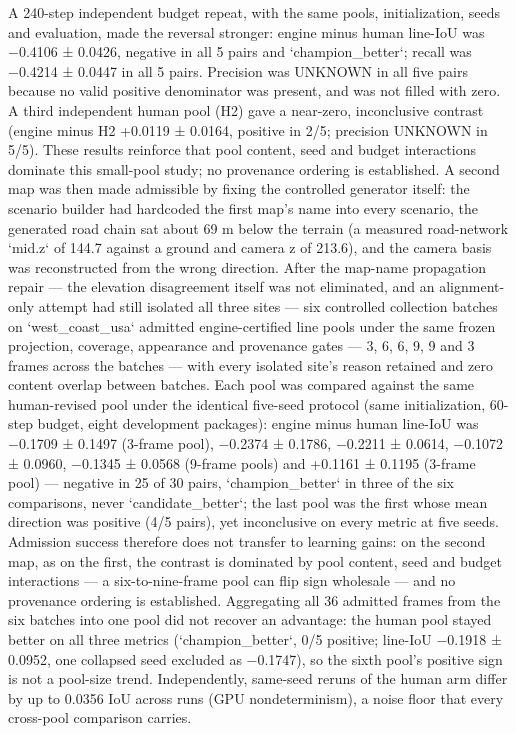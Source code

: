 \documentclass[journal]{IEEEtran}
\begin{document}
A 240-step independent budget repeat, with the same pools, initialization, seeds and evaluation, made the reversal stronger: engine minus human line-IoU was −0.4106 ± 0.0426, negative in all 5 pairs and `champion_better`; recall was −0.4214 ± 0.0447 in all 5 pairs. Precision was UNKNOWN in all five pairs because no valid positive denominator was present, and was not filled with zero. A third independent human pool (H2) gave a near-zero, inconclusive contrast (engine minus H2 +0.0119 ± 0.0164, positive in 2/5; precision UNKNOWN in 5/5). These results reinforce that pool content, seed and budget interactions dominate this small-pool study; no provenance ordering is established.
A second map was then made admissible by fixing the controlled generator itself: the scenario builder had hardcoded the first map's name into every scenario, the generated road chain sat about 69 m below the terrain (a measured road-network `mid.z` of 144.7 against a ground and camera z of 213.6), and the camera basis was reconstructed from the wrong direction. After the map-name propagation repair --- the elevation disagreement itself was not eliminated, and an alignment-only attempt had still isolated all three sites --- six controlled collection batches on `west_coast_usa` admitted engine-certified line pools under the same frozen projection, coverage, appearance and provenance gates --- 3, 6, 6, 9, 9 and 3 frames across the batches --- with every isolated site's reason retained and zero content overlap between batches. Each pool was compared against the same human-revised pool under the identical five-seed protocol (same initialization, 60-step budget, eight development packages): engine minus human line-IoU was −0.1709 ± 0.1497 (3-frame pool), −0.2374 ± 0.1786, −0.2211 ± 0.0614, −0.1072 ± 0.0960, −0.1345 ± 0.0568 (9-frame pools) and +0.1161 ± 0.1195 (3-frame pool) --- negative in 25 of 30 pairs, `champion_better` in three of the six comparisons, never `candidate_better`; the last pool was the first whose mean direction was positive (4/5 pairs), yet inconclusive on every metric at five seeds. Admission success therefore does not transfer to learning gains: on the second map, as on the first, the contrast is dominated by pool content, seed and budget interactions --- a six-to-nine-frame pool can flip sign wholesale --- and no provenance ordering is established. Aggregating all 36 admitted frames from the six batches into one pool did not recover an advantage: the human pool stayed better on all three metrics (`champion_better`, 0/5 positive; line-IoU −0.1918 ± 0.0952, one collapsed seed excluded as −0.1747), so the sixth pool's positive sign is not a pool-size trend. Independently, same-seed reruns of the human arm differ by up to 0.0356 IoU across runs (GPU nondeterminism), a noise floor that every cross-pool comparison carries.
\end{document}
